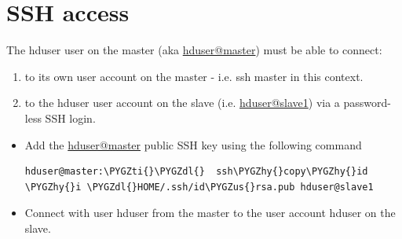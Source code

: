 \documentclass[a4paper,12pt,oneside]{sphinxmanual}
\def\PYGZus{\char`\_}
\def\PYGZdl{\char`\$}
\def\PYGZhy{\char`\-}
\def\PYGZti{\char`\~}
\begin{document}
\section{SSH access}
\label{document:ssh-access}
The hduser user on the master (aka \href{mailto:hduser@master}{hduser@master}) must be able to connect:
\begin{enumerate}
\item {} 
to its own user account on the master - i.e. ssh master in this context.

\item {} 
to the hduser user account on the slave (i.e. \href{mailto:hduser@slave1}{hduser@slave1}) via a password-less SSH login.

\end{enumerate}
\begin{itemize}
\item {} 
Add the \href{mailto:hduser@master}{hduser@master} public SSH key using the following command

\begin{Verbatim}[commandchars=\\\{\}]
hduser@master:\PYGZti{}\PYGZdl{}  ssh\PYGZhy{}copy\PYGZhy{}id \PYGZhy{}i \PYGZdl{}HOME/.ssh/id\PYGZus{}rsa.pub hduser@slave1
\end{Verbatim}

\end{itemize}
\begin{figure}[htbp]
\centering

\end{figure}
\begin{itemize}
\item {} 
Connect with user hduser from the master to the user account hduser on the slave.

\end{itemize}
\end{document}
